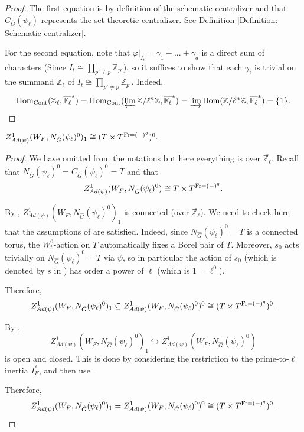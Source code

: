 \begin{proof}
	The first equation is by definition of the schematic centralizer and that $C_{\hat{G}}(\psi_{\ell})$ represents the set-theoretic centralizer. See Definition \ref{Definition: Schematic centralizer}.
	
	For the second equation, note that $\varphi|_{I_t}=\gamma_1 + ...+ \gamma_d$ is a direct sum of characters (Since $I_t \cong \prod_{p'\neq p}\mathbb{Z}_{p'}$), so it suffices to show that each $\gamma_i$ is trivial on the summand $\mathbb{Z}_{\ell}$ of $I_t\cong \prod_{p'\neq p}\mathbb{Z}_{p'}$.
	Indeed,
	$$\operatorname{\operatorname{Hom}}_{\operatorname{Cont}}(\mathbb{Z}_{\ell}, \overline{\mathbb{F}_{\ell}}^*)=\operatorname{\operatorname{Hom}}_{\operatorname{Cont}}(\varprojlim\mathbb{Z}/\ell^n\mathbb{Z}, \overline{\mathbb{F}_{\ell}}^*)=\varinjlim\operatorname{\operatorname{Hom}}(\mathbb{Z}/\ell^n\mathbb{Z}, \overline{\mathbb{F}_{\ell}}^*)=\{1\}.$$
\end{proof}

\begin{lemma}\label{Lem_Z^1()_1}
	$Z^1_{Ad(\psi)}(W_F, N_{\hat{G}}(\psi_{\ell})^0)_1 \cong (T \times T^{\operatorname{Fr}=(-)^q})^0.$
\end{lemma}

\begin{proof}
	We have omitted from the notations but here everything is over $\overline{\mathbb{Z}_{\ell}}$.
	Recall that $N_{\hat{G}}(\psi_{\ell})^0=C_{\hat{G}}(\psi_{\ell})^0=T$ and that
	$$Z^1_{Ad(\psi)}(W_F, N_{\hat{G}}(\psi_{\ell})^0) \cong T \times T^{\operatorname{Fr}=(-)^q}.$$
	
	By \cite[Section 5.4, 5.5]{dat2022ihes}, $Z^1_{Ad(\psi)}(W_F, N_{\hat{G}}(\psi_{\ell})^0)_1$ is connected (over $\overline{\mathbb{Z}_{\ell}}$). We need to check here that the assumptions of \cite[Section 5.4, 5.5]{dat2022ihes} are satisfied. Indeed, since $N_{\hat{G}}(\psi_{\ell})^0=T$ is a connected torus, the $W_t^0$-action on $T$ automatically fixes a Borel pair of $T$. Moreover, $s_0$ acts trivially on $N_{\hat{G}}(\psi_{\ell})^0=T$ via $\psi$, so in particular the action of $s_0$ (which is denoted by $s$ in \cite[Section 5.5]{dat2022ihes}) has order a power of $\ell$ (which is $1 = \ell^0$).
	
	Therefore, 
	$$Z^1_{Ad(\psi)}(W_F, N_{\hat{G}}(\psi_{\ell})^0)_1 \subseteq Z^1_{Ad(\psi)}(W_F, N_{\hat{G}}(\psi_{\ell})^0)^0 \cong (T \times T^{\operatorname{Fr}=(-)^q})^0.$$
	
	By \cite[Section 4.6]{dat2022ihes}, 
	$$Z^1_{Ad(\psi)}(W_F, N_{\hat{G}}(\psi_{\ell})^0)_1 \hookrightarrow Z^1_{Ad(\psi)}(W_F, N_{\hat{G}}(\psi_{\ell})^0)$$
	is open and closed. This is done by considering the restriction to the prime-to-$\ell$ inertia $I_F^{\ell}$, and then use \cite[Theorem 4.2]{dat2022ihes}.
	
	Therefore, 
	$$Z^1_{Ad(\psi)}(W_F, N_{\hat{G}}(\psi_{\ell})^0)_1 = Z^1_{Ad(\psi)}(W_F, N_{\hat{G}}(\psi_{\ell})^0)^0 \cong (T \times T^{\operatorname{Fr}=(-)^q})^0.$$
	
\end{proof}




